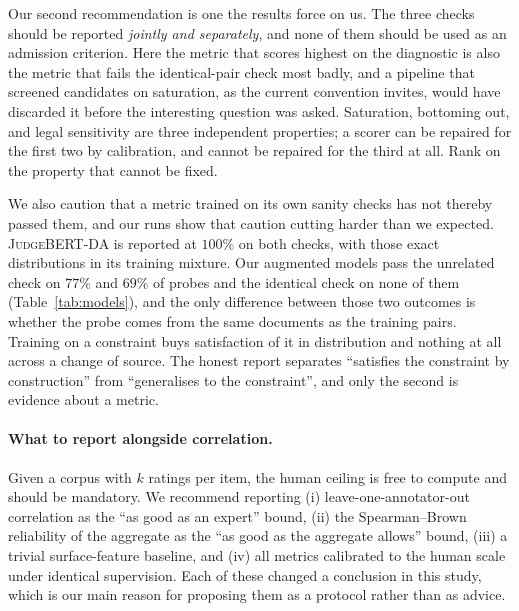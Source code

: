 \documentclass[11pt]{article}
\begin{document}
Our second recommendation is one the results force on us. The three checks
should be reported \emph{jointly and separately}, and none of them should be
used as an admission criterion. Here the metric that scores highest on the
diagnostic is also the metric that fails the identical-pair check most badly,
and a pipeline that screened candidates on saturation, as the current convention
invites, would have discarded it before the interesting question was asked.
Saturation, bottoming out, and legal sensitivity are three independent
properties; a scorer can be repaired for the first two by calibration, and
cannot be repaired for the third at all. Rank on the property that cannot be
fixed.

We also caution that a metric trained on its own sanity checks has not thereby
passed them, and our runs show that caution cutting harder than we expected.
\textsc{JudgeBERT}-DA is reported at $100\%$ on both checks, with those exact
distributions in its training mixture. Our augmented models pass the unrelated
check on $77\%$ and $69\%$ of probes and the identical check on none of them
(Table~\ref{tab:models}), and the only difference between those two outcomes is
whether the probe comes from the same documents as the training pairs. Training
on a constraint buys satisfaction of it in distribution and nothing at all
across a change of source. The honest report separates ``satisfies the
constraint by construction'' from ``generalises to the constraint'', and only
the second is evidence about a metric.

\paragraph{What to report alongside correlation.}
Given a corpus with $k$ ratings per item, the human ceiling is free to compute
and should be mandatory. We recommend reporting (i) leave-one-annotator-out
correlation as the ``as good as an expert'' bound, (ii) the Spearman--Brown
reliability of the aggregate as the ``as good as the aggregate allows'' bound,
(iii) a trivial surface-feature baseline, and (iv) all metrics calibrated to the
human scale under identical supervision. Each of these changed a conclusion in
this study, which is our main reason for proposing them as a protocol rather
than as advice.
\end{document}
